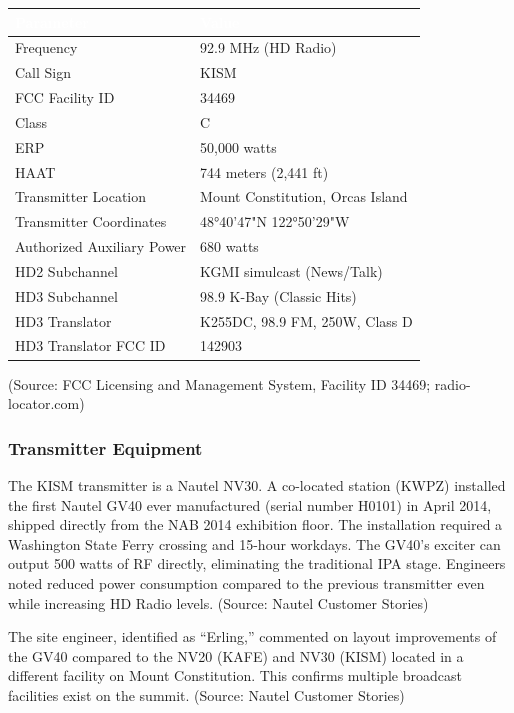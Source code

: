 \documentclass[11pt,letterpaper]{article}
\newcommand{\tableheader}[1]{\textbf{\sffamily\textcolor{white}{#1}}}
\begin{document}
\begin{center}
\begin{tabularx}{\textwidth}{L{4cm}X}
\toprule
{}
\tableheader{Parameter} & \tableheader{Value} \\
\midrule
Frequency & 92.9 MHz (HD Radio) \\
Call Sign & KISM \\
FCC Facility ID & 34469 \\
Class & C \\
ERP & 50,000 watts \\
HAAT & 744 meters (2,441 ft) \\
Transmitter Location & Mount Constitution, Orcas Island \\
Transmitter Coordinates & 48°40'47"N 122°50'29"W \\
Authorized Auxiliary Power & 680 watts \\
HD2 Subchannel & KGMI simulcast (News/Talk) \\
HD3 Subchannel & 98.9 K-Bay (Classic Hits) \\
HD3 Translator & K255DC, 98.9 FM, 250W, Class D \\
HD3 Translator FCC ID & 142903 \\
\bottomrule
\end{tabularx}
\end{center}

(Source: FCC Licensing and Management System, Facility ID 34469; radio-locator.com)

\subsubsection{Transmitter Equipment}

The KISM transmitter is a Nautel NV30. A co-located station (KWPZ) installed the first Nautel GV40 ever manufactured (serial number H0101) in April 2014, shipped directly from the NAB 2014 exhibition floor. The installation required a Washington State Ferry crossing and 15-hour workdays. The GV40's exciter can output 500 watts of RF directly, eliminating the traditional IPA stage. Engineers noted reduced power consumption compared to the previous transmitter even while increasing HD Radio levels. (Source: Nautel Customer Stories)

The site engineer, identified as ``Erling,'' commented on layout improvements of the GV40 compared to the NV20 (KAFE) and NV30 (KISM) located in a different facility on Mount Constitution. This confirms multiple broadcast facilities exist on the summit. (Source: Nautel Customer Stories)
\end{document}
